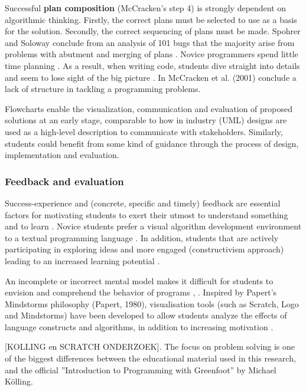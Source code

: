 Successful \textbf{plan composition} (McCracken's step 4) is strongly
dependent on algorithmic thinking. Firstly, the correct plans must be
selected \cite{deRaadt2008} to use as a basis for the solution. Secondly, the
correct sequencing of plans must be made. Spohrer and Soloway
\cite{Soloway1982} conclude from an analysis of 101 bugs that the majority
arise from problems with abutment and merging of plans
\cite{spohrer1986novice}. Novice programmers spend little time planning
\cite{robins2003learning}.  As a result, when writing code, students dive
straight into details and seem to lose sight of the big picture
\cite{Chetty2015towards}. In McCracken et al. (2001) conclude a lack of
structure in tackling a programming problems\cite{McCracken2001}.




Flowcharts enable the visualization, communication and evaluation of proposed
solutions at an early stage, comparable to how in industry (UML) designs are
used as a high-level description to communicate with stakeholders. Similarly,
students could benefit from some kind of guidance through the process of
design, implementation and evaluation.




\subsubsection{Feedback and evaluation}

Success-experience and (concrete, specific and timely) feedback are essential
factors for motivating students to exert their utmost to understand something
and to learn \cite{Ebbens}. Novice students prefer a visual algorithm
development environment to a textual programming language
\cite{Carlisle2005}. In addition, students that are actively participating in
exploring ideas and more engaged (constructivism approach) leading to an
increased learning potential \cite{Ebbens}.

An incomplete or incorrect mental model makes it difficult for students to
envision and comprehend the behavior of programs \cite{sorva2013notional},
\cite{Chetty2015towards}. Inspired by Papert's Mindstorms philosophy (Papert,
1980), visualisation tools (such as Scratch, Logo and Mindstorms) have been
developed to allow students analyze the effects of language constructs and
algorithms, in addition to increasing motivation \cite{Chetty2015towards}.


[KOLLING en SCRATCH ONDERZOEK]. The focus on problem solving is one of the
biggest differences between the educational material used in this research,
and the official ''Introduction to Programming with Greenfoot'' by Michael
K\"olling.


